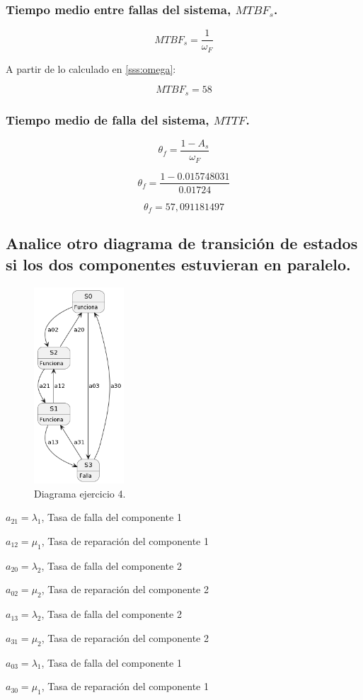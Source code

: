 \documentclass[
    11pt,
    spanish,
    a4paper
]{article}
\begin{document}
\subsubsection{Tiempo medio entre fallas del sistema, $ MTBF_s $.}

$$ MTBF_s = \frac{1}{\omega_F } $$

A partir de lo calculado en \ref{sss:omega}:

$$ MTBF_s = 58 $$

\subsubsection{Tiempo medio de falla del sistema, $ MTTF $.}

$$ \theta_f = \frac{1-A_s}{\omega_F} $$

$$ \theta_f = \frac{1-0.015748031}{0.01724} $$

$$ \theta_f =  57,091181497 $$


\subsection{Analice otro diagrama de transición de estados si los dos componentes estuvieran en paralelo.}

\begin{figure}[htbp]
	\centering
	\includegraphics[width=0.3\textwidth]{img/diagrama_estados_2.png}
	\caption{Diagrama ejercicio 4.}
	\label{fig:diagrama_estados_2}
\end{figure}

$ a_{21} = \lambda_1 $, Tasa de falla del componente 1

$ a_{12} = \mu_1 $, Tasa de reparación del componente 1

$ a_{20} = \lambda_2 $, Tasa de falla del componente 2

$ a_{02} = \mu_2 $, Tasa de reparación del componente 2

$ a_{13} = \lambda_2 $, Tasa de falla del componente 2

$ a_{31} = \mu_2 $, Tasa de reparación del componente 2

$ a_{03} = \lambda_1 $, Tasa de falla del componente 1

$ a_{30} = \mu_1 $, Tasa de reparación del componente 1
\end{document}
